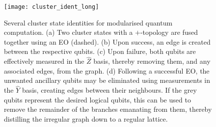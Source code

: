 \pubmode
\begin{figure}[!htbp]
	\texttt{[image: cluster\_ident\_long]}
	\captionspacefig \caption{Several cluster state identities for modularised quantum computation. (a) Two cluster states with a $+$-topology are fused together using an EO (dashed). (b) Upon success, an edge is created between the respective qubits. (c) Upon failure, both qubits are effectively measured in the $\hat{Z}$ basis, thereby removing them, and any associated edges, from the graph. (d) Following a successful EO, the unwanted ancillary qubits may be eliminated using measurements in the $\hat{Y}$ basis, creating edges between their neighbours. If the grey qubits represent the desired logical qubits, this can be used to remove the remainder of the branches emanating from them, thereby distilling the irregular graph down to a regular lattice.} \label{fig:plus_cluster_ident}
	\end{figure}
\else
